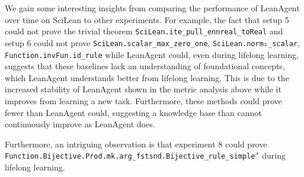 \documentclass{article} %
\begin{document}


We gain some interesting insights from comparing the performance of LeanAgent over time on SciLean to other experiments. For example, the fact that setup 5 could not prove the trivial theorem \texttt{SciLean.ite\_pull\_ennreal\_toReal} and setup 6 could not prove \texttt{SciLean.scalar\_max\_zero\_one}, \texttt{SciLean.norm₂\_scalar}, \texttt{Function.invFun.id\_rule} while LeanAgent could, even during lifelong learning, suggests that these baselines lack an understanding of foundational concepts, which LeanAgent understands better from lifelong learning. This is due to the increased stability of LeanAgent shown in the metric analysis above while it improves from learning a new task. Furthermore, these methods could prove fewer than LeanAgent could, suggesting a knowledge base than cannot continuously improve as LeanAgent does.


Furthermore, an intriguing observation is that experiment 8 could prove \texttt{Function.Bijective.Prod.mk.arg\_fstsnd.Bijective\_rule\_simple'} during lifelong learning. 
\end{document}
